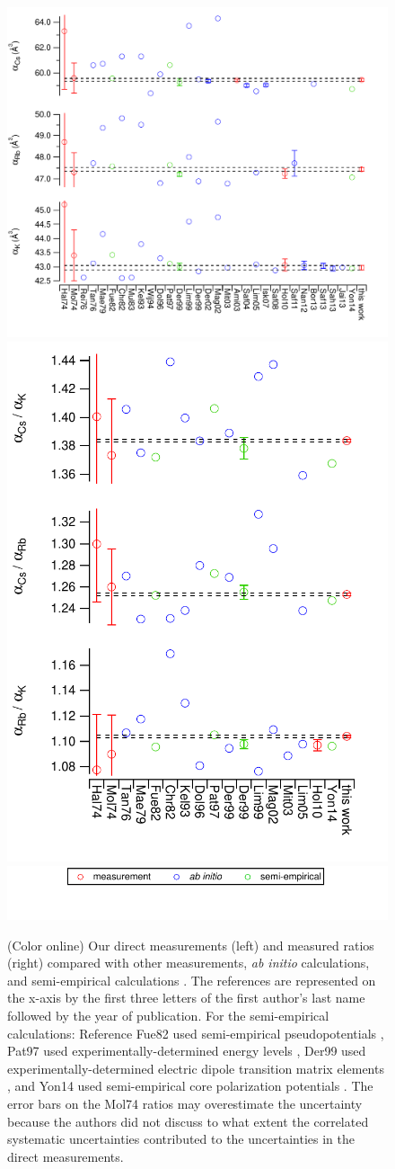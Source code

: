 \documentclass[twocolumn,prl,showpacs,superscriptaddress]{revtex4-1}   %
\begin{document}
\begin{figure}
\includegraphics[width=0.60\linewidth,keepaspectratio]{displayAbsComps.pdf}
\includegraphics[width=0.38\linewidth,keepaspectratio]{displayRatComps.pdf}
\includegraphics[width=0.55\linewidth,keepaspectratio]{displayCompsLegend.pdf}
\caption{\label{comparisons}(Color online) Our direct measurements (left) and measured ratios (right) compared with other measurements, \textit{ab initio} calculations, and semi-empirical calculations 
\cite{Molof1974a,Hall1974,Tang1976,Reinsch1976,Kutzelnigg1978,
Christiansen1982,Fuentealba1999,Muller1984,Kello1993,VanWijngaarden1994,
Dolg1996,Patil1997,Derevianko1998,Magnier2002,Derevianko2001,
Amini2003,Mitroy2003,Safronova2004,Lim2005,Safronova2008,
Holmgren2010,Safronova2011,Nandy2012,Jiang2013,Sahoo2013,
Safronova2013,Borschevsky2013,Y.-B.2014}.
The references are represented on the x-axis by the first three letters of the first author's last name followed by the year of publication. For the semi-empirical calculations: Reference Fue82 used semi-empirical pseudopotentials \cite{Fuentealba1999}, Pat97 used experimentally-determined energy levels \cite{Patil1997}, Der99 used experimentally-determined electric dipole transition matrix elements \cite{Derevianko1998}, and Yon14 used semi-empirical core polarization potentials \cite{Y.-B.2014}. The error bars on the Mol74 ratios may overestimate the uncertainty because the authors did not discuss to what extent the correlated systematic uncertainties contributed to the uncertainties in the direct measurements. }
\end{figure}
\end{document}
